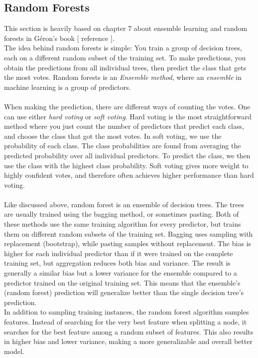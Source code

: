 \documentclass[12pt]{article}
\numberwithin{figure}{section}
\newcommand{\husk}[1]{\color{red} #1 \color{black}}
\begin{document}
\subsection{Random Forests}
This section is heavily based on chapter 7 about ensemble learning and random forests in Géron's book [\husk{reference}].\\
The idea behind random forests is simple: You train a group of decision trees, each on a different random subset of the training set. To make predictions, you obtain the predictions from all individual trees, then predict the class that gets the most votes. Random forests is an \textit{Ensemble method}, where an \textit{ensemble} in machine learning is  a group of predictors.\\ \\
When making the prediction, there are different ways of counting the votes. One can use either \textit{hard voting} or \textit{soft voting}. Hard voting is the most straightforward method where you just count the number of predictors that predict each class, and choose the class that got the most votes. In soft voting, we use the probability of each class. The class probabilities are found from averaging the predicted probability over all individual predictors. To predict the class, we then use the class with the highest class probability. Soft voting gives more weight to highly confident votes, and therefore often achieves higher performance than hard voting.\\ \\
Like discussed above, random forest is an ensemble of decision trees. The trees are usually trained using the bagging method, or sometimes pasting. Both of these methods use the same training algorithm for every predictor, but trains them on different random subsets of the training set. Bagging uses sampling with replacement (bootstrap), while pasting samples without replacement. The bias is higher for each individual predictor than if it were trained on the complete training set, but aggregation reduces both bias and variance. The result is generally a similar bias but a lower variance for the ensemble compared to a predictor trained on the original training set. This means that the ensemble's (random forest) prediction will generalize better than the single decision tree's prediction.\\
In addition to sampling training instances, the random forest algorithm samples features. Instead of searching for the very best feature when splitting a node, it searches for the best feature among a random subset of features. This also results in higher bias and lower variance, making a more generalizable and overall better model.\\ \\
\end{document}
